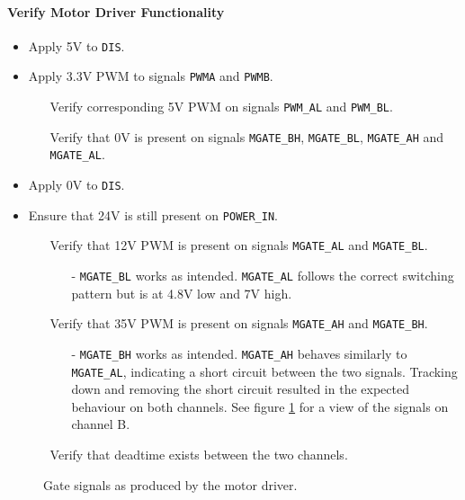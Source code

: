 \paragraph{Verify Motor Driver Functionality} %
\label{par:verify_motor_driver_functionality}
\begin{itemize}
	\item Apply 5V to \texttt{DIS}.
	\item Apply 3.3V PWM to signals \texttt{PWMA} and \texttt{PWMB}.
	\begin{itemize}
		\item[\cmark] Verify corresponding 5V PWM on signals \texttt{PWM\_AL} and \texttt{PWM\_BL}.
		\item[\cmark] Verify that 0V is present on signals \texttt{MGATE\_BH}, \texttt{MGATE\_BL}, \texttt{MGATE\_AH} and \texttt{MGATE\_AL}.
	\end{itemize}
	\item Apply 0V to \texttt{DIS}.
	\item Ensure that 24V is still present on \texttt{POWER\_IN}.
	\begin{itemize}
		\item[\xmark] Verify that 12V PWM is present on signals \texttt{MGATE\_AL} and \texttt{MGATE\_BL}.
		\begin{itemize}
			\item[-] \texttt{MGATE\_BL} works as intended.
			\texttt{MGATE\_AL} follows the correct switching pattern but is at 4.8V low and 7V high.  
		\end{itemize}
		\item[\xmark] Verify that 35V PWM is present on signals \texttt{MGATE\_AH} and \texttt{MGATE\_BH}.
		\begin{itemize}
			\item [-] \texttt{MGATE\_BH} works as intended.
			\texttt{MGATE\_AH} behaves similarly to \texttt{MGATE\_AL}, indicating a short circuit between the two signals.
			Tracking down and removing the short circuit resulted in the expected behaviour on both channels.
			See figure \ref{fig:controllerboardv2_gate_b} for a view of the signals on channel B.
		\end{itemize}
		\item[\cmark] Verify that deadtime exists between the two channels.
	\end{itemize}
\end{itemize}


\begin{figure}[h]
	\centering
    
	\caption{Gate signals as produced by the motor driver.}
	\label{fig:controllerboardv2_gate_b}
\end{figure}

